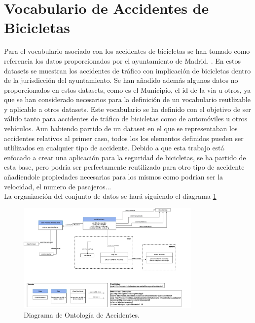 \section{Vocabulario de Accidentes de Bicicletas}

Para el vocabulario asociado con los accidentes de bicicletas se han tomado como referencia los datos proporcionados por el ayuntamiento de Madrid.  \cite{datosMadrid_accidentesDeBicicleta}. En estos datasets se muestran los accidentes de tráfico con implicación de bicicletas dentro de la jurisdicción del ayuntamiento.
\newline
Se han añadido además algunos datos no proporcionados en estos datasets, como es el Municipio, el id de la via u otros, ya que se han considerado necesarios para la definición de un vocabulario reutlizable y aplicable a otros datasets.
\newline
Este vocabulario se ha definido con el objetivo de ser válido tanto para accidentes de tráfico de bicicletas como de automóviles u otros vehículos. Aun habiendo partido de un dataset en el que se representaban los accidentes relativos al primer caso, todos los los elementos definidos pueden ser utlilizados en cualquier tipo de accidente. Debido a que esta trabajo está enfocado a crear una aplicación para la seguridad de bicicletas, se ha partido de esta base, pero podria ser perfectamente reutilizado para otro tipo de accidente añadiendole propiedades necesarias para los mismos como podrian ser la velocidad, el numero de pasajeros...
\\
La organización del conjunto de datos se hará siguiendo el diagrama \ref{fig:diagramaOntologAccid}

\begin{figure}[h]
	\centering
		\includegraphics[angle=0, width=0.8\textwidth]{images/diagramaAccidBici.png}  
	\caption{Diagrama de Ontología de Accidentes.}
	\label{fig:diagramaOntologAccid}
\end{figure}


